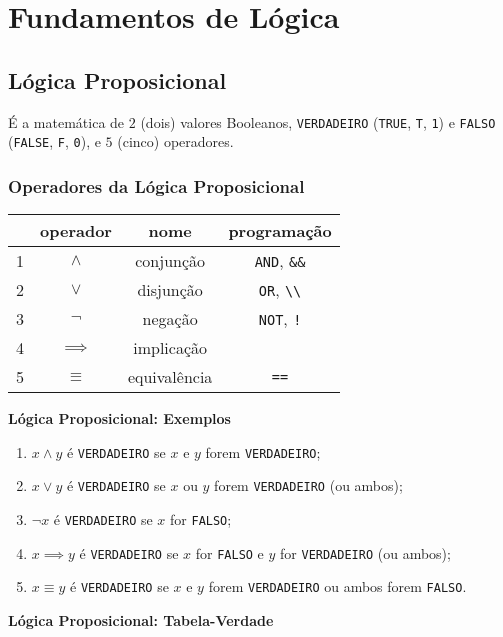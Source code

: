     
\section*{Fundamentos de Lógica}

\subsection*{Lógica Proposicional}

É a matemática de \(2\) (dois) valores Booleanos, \texttt{VERDADEIRO}
(\texttt{TRUE}, \texttt{T}, \texttt{1}) e \texttt{FALSO}
(\texttt{FALSE}, \texttt{F}, \texttt{0}), e \(5\) (cinco) operadores.

\subsubsection*{Operadores da Lógica
Proposicional}

\begin{longtable}[]{@{}lccc@{}}
& operador & nome & programação\tabularnewline
\endhead
1 & \(\land\) & conjunção & \texttt{AND}, \texttt{\&\&}\tabularnewline
2 & \(\lor\) & disjunção & \texttt{OR},
\texttt{\textbackslash{}\textbar{}\textbackslash{}\textbar{}}\tabularnewline
3 & \(\lnot\) & negação & \texttt{NOT}, \texttt{!}\tabularnewline
4 & \(\implies\) & implicação &\tabularnewline
5 & \(\equiv\) & equivalência & \texttt{==}\tabularnewline
\end{longtable}

    \textbf{Lógica Proposicional: Exemplos}

\begin{enumerate}
\def\labelenumi{\arabic{enumi}.}
\item
  \(x \land y\) é \texttt{VERDADEIRO} se \(x\) e \(y\) forem
  \texttt{VERDADEIRO};
\item
  \(x \lor y\) é \texttt{VERDADEIRO} se \(x\) ou \(y\) forem
  \texttt{VERDADEIRO} (ou ambos);
\item
  \(\lnot x\) é \texttt{VERDADEIRO} se \(x\) for \texttt{FALSO};
\item
  \(x \implies y\) é \texttt{VERDADEIRO} se \(x\) for \texttt{FALSO} e
  \(y\) for \texttt{VERDADEIRO} (ou ambos);
\item
  \(x\equiv y\) é \texttt{VERDADEIRO} se \(x\) e \(y\) forem
  \texttt{VERDADEIRO} ou ambos forem \texttt{FALSO}.
\end{enumerate}

    \textbf{Lógica Proposicional: Tabela-Verdade}

